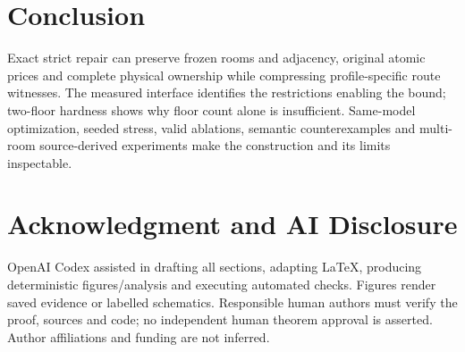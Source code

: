 \section{Conclusion}
Exact strict repair can preserve frozen rooms and adjacency, original atomic prices and complete physical ownership while compressing profile-specific route witnesses. The measured interface identifies the restrictions enabling the bound; two-floor hardness shows why floor count alone is insufficient. Same-model optimization, seeded stress, valid ablations, semantic counterexamples and multi-room source-derived experiments make the construction and its limits inspectable.

\section*{Acknowledgment and AI Disclosure}
OpenAI Codex assisted in drafting all sections, adapting LaTeX, producing deterministic figures/analysis and executing automated checks. Figures render saved evidence or labelled schematics. Responsible human authors must verify the proof, sources and code; no independent human theorem approval is asserted. Author affiliations and funding are not inferred.

